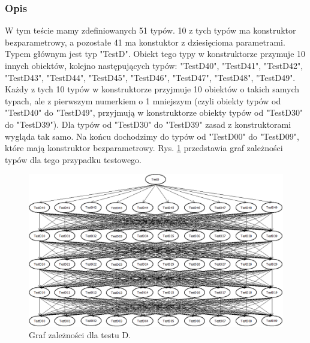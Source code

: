 \documentclass[12pt]{article}
\begin{document}
\subsubsection{Opis}
W tym teście mamy zdefiniowanych 51 typów. 10 z tych typów ma konstruktor bezparametrowy, a pozostałe 41 ma konstuktor z dziesięcioma parametrami. Typem głównym jest typ "TestD". Obiekt tego typy w konstruktorze przymuje 10 innych obiektów, kolejno następujących typów: "TestD40", "TestD41", "TestD42", "TestD43", "TestD44", "TestD45", "TestD46", "TestD47", "TestD48", "TestD49". Każdy z tych 10 typów w konstruktorze przyjmuje 10 obiektów o takich samych typach, ale z pierwszym numerkiem o 1 mniejszym (czyli obiekty typów od "TestD40" do "TestD49", przyjmują w konstruktorze obiekty typów od "TestD30" do "TestD39"). Dla typów od "TestD30" do "TestD39" zasad z konstruktorami wygląda tak samo. Na końcu dochodzimy do typów od "TestD00" do "TestD09", które mają konstruktor bezparametrowy. Rys. \ref{fig:testD} przedstawia graf zależności typów dla tego przypadku testowego.

\begin{figure}[h]
	\begin{center}
  		\includegraphics[width=\linewidth]{TestD.png}
  		\caption{Graf zależności dla testu D.}
  		\label{fig:testD}
	\end{center}
\end{figure}
\end{document}
